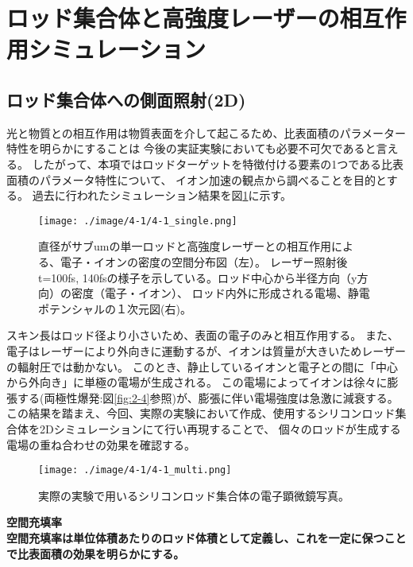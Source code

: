 \documentclass[a4paper,11pt,titlepage]{jsarticle}
\begin{document}
    \section{ロッド集合体と高強度レーザーの相互作用シミュレーション}
    \subsection{ロッド集合体への側面照射(2D)}
    光と物質との相互作用は物質表面を介して起こるため、比表面積のパラメーター特性を明らかにすることは
    今後の実証実験においても必要不可欠であると言える。
    したがって、本項ではロッドターゲットを特徴付ける要素の1つである比表面積のパラメータ特性について、
    イオン加速の観点から調べることを目的とする。
    過去に行われたシミュレーション結果を図\ref{4-1_single}に示す。
    \begin{figure}[H]
      \begin{center}
        \texttt{[image: ./image/4-1/4-1\_single.png]}
        \caption{
          \label{4-1_single}
          直径がサブumの単一ロッドと高強度レーザーとの相互作用による、電子・イオンの密度の空間分布図（左）。
          レーザー照射後t=100fs, 140fsの様子を示している。ロッド中心から半径方向（y方向）の密度（電子・イオン）、
          ロッド内外に形成される電場、静電ポテンシャルの１次元図(右)。
        }
      \end{center}
    \end{figure}
    スキン長はロッド径より小さいため、表面の電子のみと相互作用する。
    また、電子はレーザーにより外向きに運動するが、イオンは質量が大きいためレーザーの輻射圧では動かない。
    このとき、静止しているイオンと電子との間に「中心から外向き」に単極の電場が生成される。
    この電場によってイオンは徐々に膨張する(両極性爆発:図\ref{fig:2-4}参照)が、膨張に伴い電場強度は急激に減衰する。
    この結果を踏まえ、今回、実際の実験において作成、使用するシリコンロッド集合体を2Dシミュレーションにて行い再現することで、
    個々のロッドが生成する電場の重ね合わせの効果を確認する。
    \begin{figure}[H]
      \begin{center}
        \texttt{[image: ./image/4-1/4-1\_multi.png]}
        \label{}
        \caption{
          実際の実験で用いるシリコンロッド集合体の電子顕微鏡写真。
        }
      \end{center}
    \end{figure}
    \bf
    空間充填率\\
    \rm
    空間充填率は単位体積あたりのロッド体積として定義し、これを一定に保つことで比表面積の効果を明らかにする。
\end{document}
